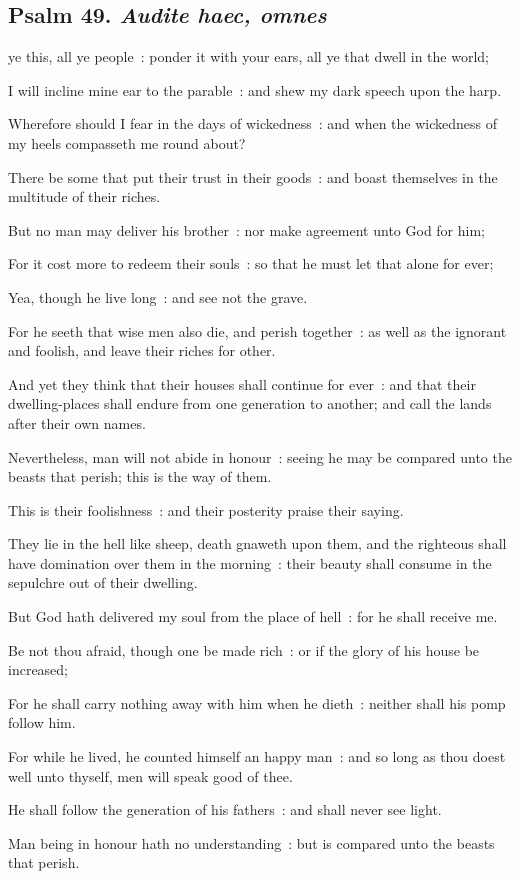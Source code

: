 \clearpage
\subsection{Psalm 49. \textit{Audite haec, omnes}}

 ye this, all ye people~: ponder it with your ears, all ye that dwell in the world;\par
{}
I will incline mine ear to the parable~: and shew my dark speech upon the harp.\par
{}Wherefore should I fear in the days of wickedness~: and when the wickedness of my heels compasseth me round about?\par
{}There be some that put their trust in their goods~: and boast themselves in the multitude of their riches.\par
{}But no man may deliver his brother~: nor make agreement unto God for him;\par
{}For it cost more to redeem their souls~: so that he must let that alone for ever;\par
{}Yea, though he live long~: and see not the grave.\par
{}For he seeth that wise men also die, and perish together~: as well as the ignorant and foolish, and leave their riches for other.\par
{}And yet they think that their houses shall continue for ever~: and that their dwelling-places shall endure from one generation to another; and call the lands after their own names.\par
{}Nevertheless, man will not abide in honour~: seeing he may be compared unto the beasts that perish; this is the way of them.\par
{}This is their foolishness~: and their posterity praise their saying.\par
{}They lie in the hell like sheep, death gnaweth upon them, and the righteous shall have domination over them in the morning~: their beauty shall consume in the sepulchre out of their dwelling.\par
{}But God hath delivered my soul from the place of hell~: for he shall receive me.\par
{}Be not thou afraid, though one be made rich~: or if the glory of his house be increased;\par
{}For he shall carry nothing away with him when he dieth~: neither shall his pomp follow him.\par
{}For while he lived, he counted himself an happy man~: and so long as thou doest well unto thyself, men will speak good of thee.\par
{}He shall follow the generation of his fathers~: and shall never see light.\par
{}Man being in honour hath no understanding~: but is compared unto the beasts that perish.\par

